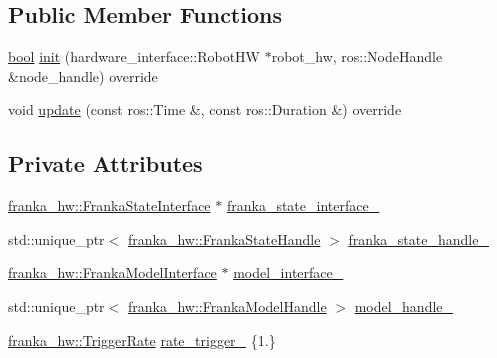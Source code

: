\subsection*{Public Member Functions}
\begin{DoxyCompactItemize}
\item 
\hyperlink{classbool}{bool} \hyperlink{classfranka__example__controllers_1_1ModelExampleController_a423f7ebfd4e0b81cdfbefbdb002cde37}{init} (hardware\+\_\+interface\+::\+Robot\+HW $\ast$robot\+\_\+hw, ros\+::\+Node\+Handle \&node\+\_\+handle) override
\item 
void \hyperlink{classfranka__example__controllers_1_1ModelExampleController_ac80410c22f5e1c98da93ba150a390d2d}{update} (const ros\+::\+Time \&, const ros\+::\+Duration \&) override
\end{DoxyCompactItemize}
\subsection*{Private Attributes}
\begin{DoxyCompactItemize}
\item 
\hyperlink{classfranka__hw_1_1FrankaStateInterface}{franka\+\_\+hw\+::\+Franka\+State\+Interface} $\ast$ \hyperlink{classfranka__example__controllers_1_1ModelExampleController_a299d64b2e65f3d2259ea2468638337e2}{franka\+\_\+state\+\_\+interface\+\_\+}
\item 
std\+::unique\+\_\+ptr$<$ \hyperlink{classfranka__hw_1_1FrankaStateHandle}{franka\+\_\+hw\+::\+Franka\+State\+Handle} $>$ \hyperlink{classfranka__example__controllers_1_1ModelExampleController_a6619cd4e5d970fde0779dfa8d5da2b71}{franka\+\_\+state\+\_\+handle\+\_\+}
\item 
\hyperlink{classfranka__hw_1_1FrankaModelInterface}{franka\+\_\+hw\+::\+Franka\+Model\+Interface} $\ast$ \hyperlink{classfranka__example__controllers_1_1ModelExampleController_a832283a8b75f7e65ee03839a18b54f18}{model\+\_\+interface\+\_\+}
\item 
std\+::unique\+\_\+ptr$<$ \hyperlink{classfranka__hw_1_1FrankaModelHandle}{franka\+\_\+hw\+::\+Franka\+Model\+Handle} $>$ \hyperlink{classfranka__example__controllers_1_1ModelExampleController_a6eb1270e267595e0e281ee765f0ec550}{model\+\_\+handle\+\_\+}
\item 
\hyperlink{classfranka__hw_1_1TriggerRate}{franka\+\_\+hw\+::\+Trigger\+Rate} \hyperlink{classfranka__example__controllers_1_1ModelExampleController_aff2c4d48db198405dd9f4366cdedb82f}{rate\+\_\+trigger\+\_\+} \{1.\}
\end{DoxyCompactItemize}


